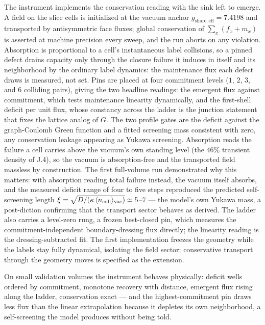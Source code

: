 \documentclass[11pt]{article}
\begin{document}
The instrument implements the conservation reading with the sink left to emerge. A field on the slice cells is initialized at the vacuum anchor $g_{\mathrm{share,eff}}=7.4198$ and transported by antisymmetric face fluxes; global conservation of $\sum_x(f_x+m_x)$ is asserted at machine precision every sweep, and the run aborts on any violation. Absorption is proportional to a cell's instantaneous label collisions, so a pinned defect drains capacity only through the closure failure it induces in itself and its neighborhood by the ordinary label dynamics: the maintenance flux each defect draws is measured, not set. Pins are placed at four commitment levels ($1$, $2$, $3$, and $6$ colliding pairs), giving the two headline readings: the emergent flux against commitment, which tests maintenance linearity dynamically, and the first-shell deficit per unit flux, whose constancy across the ladder is the junction statement that fixes the lattice analog of $G$. The two profile gates are the deficit against the graph-Coulomb Green function and a fitted screening mass consistent with zero, any conservation leakage appearing as Yukawa screening. Absorption reads the failure a cell carries above the vacuum's own standing level (the $46\%$ transient density of J.4), so the vacuum is absorption-free and the transported field massless by construction. The first full-volume run demonstrated why this matters: with absorption reading total failure instead, the vacuum itself absorbs, and the measured deficit range of four to five steps reproduced the predicted self-screening length $\xi=\sqrt{D/(\kappa\,\langle n_{\rm coll}\rangle_{\rm vac})}\simeq5$--$7$ --- the model's own Yukawa mass, a post-diction confirming that the transport sector behaves as derived. The ladder also carries a level-zero rung, a frozen best-closed pin, which measures the commitment-independent boundary-dressing flux directly; the linearity reading is the dressing-subtracted fit. The first implementation freezes the geometry while the labels stay fully dynamical, isolating the field sector; conservative transport through the geometry moves is specified as the extension.

On small validation volumes the instrument behaves physically: deficit wells ordered by commitment, monotone recovery with distance, emergent flux rising along the ladder, conservation exact --- and the highest-commitment pin draws less flux than the linear extrapolation because it depletes its own neighborhood, a self-screening the model produces without being told.
\end{document}
